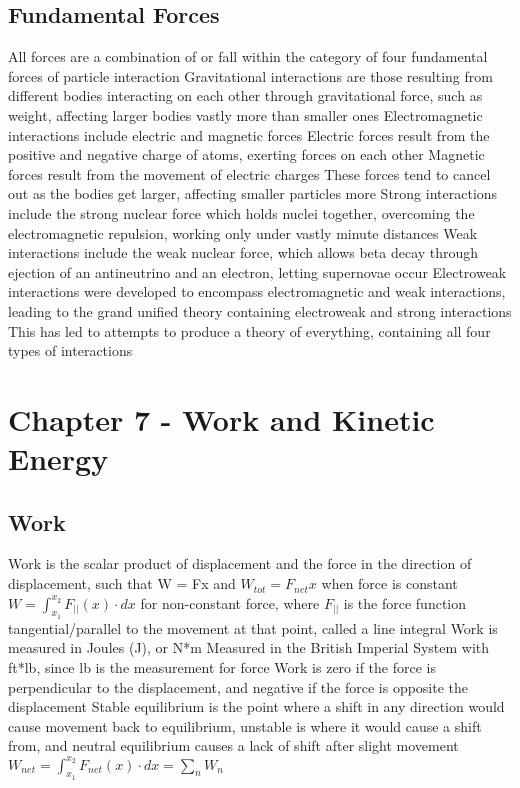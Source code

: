 \documentclass[11 pt, twoside]{article}
\newenvironment{outline*}
{
	\begin{outline}[enumerate]
	}
	{\end{outline}
}
\begin{document}
\subsection{Fundamental Forces}
\begin{outline*}
\1 All forces are a combination of or fall within the category of four fundamental forces of particle interaction
\1 Gravitational interactions are those resulting from different bodies interacting on each other through gravitational force, such as weight, affecting larger bodies vastly more than smaller ones
\1 Electromagnetic interactions include electric and magnetic forces
\2 Electric forces result from the positive and negative charge of atoms, exerting forces on each other
\2 Magnetic forces result from the movement of electric charges
\2 These forces tend to cancel out as the bodies get larger, affecting smaller particles more
\1 Strong interactions include the strong nuclear force which holds nuclei together, overcoming the electromagnetic repulsion, working only under vastly minute distances
\1 Weak interactions include the weak nuclear force, which allows beta decay through ejection of an antineutrino and an electron, letting supernovae occur
\1 Electroweak interactions were developed to encompass electromagnetic and weak interactions, leading to the grand unified theory containing electroweak and strong interactions
\2 This has led to attempts to produce a theory of everything, containing all four types of interactions
\end{outline*}
\section{Chapter 7 - Work and Kinetic Energy}
\subsection{Work}
\begin{outline*}
\1 Work is the scalar product of displacement and the force in the direction of displacement, such that W = Fx and $W_{tot} = F_{net}x$ when force is constant
\2 $W = \int^{x_2}_{x_1} F_{||}(x) \cdot dx$ for non-constant force, where $F_{||}$ is the force function tangential/parallel to the movement at that point, called a line integral
\2 Work is measured in Joules (J), or N*m
\2 Measured in the British Imperial System with ft*lb, since lb is the measurement for force
\1 Work is zero if the force is perpendicular to the displacement, and negative if the force is opposite the displacement
\1 Stable equilibrium is the point where a shift in any direction would cause movement back to equilibrium, unstable is where it would cause a shift from, and neutral equilibrium causes a lack of shift after slight movement
\1 $W_{net} = \int^{x_2}_{x_1} F_{net}(x) \cdot dx = \sum_n W_n$
\end{outline*}
\end{document}
